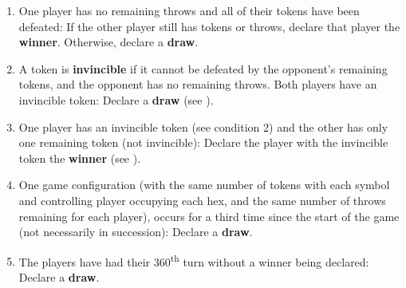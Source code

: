\documentclass[]{article}
\begin{document}
\begin{enumerate}
    \item
        One player has no remaining throws and all of their tokens have
        been defeated:
        If the other player still has tokens or throws, declare that player
        the \textbf{winner}.
        Otherwise, declare a \textbf{draw}.
    \item
        A token is \textbf{invincible} if it cannot be defeated by the
        opponent's remaining tokens, and the opponent has no remaining
        throws.
        Both players have an invincible token: Declare a \textbf{draw}
        (see ).
    \item
        One player has an invincible token (see condition 2) and the
        other has only one remaining token (not invincible):
        Declare the player with the invincible token the \textbf{winner}
        (see ).
    \item
        One game configuration (with the same number of tokens with each
        symbol and controlling player occupying each hex, and the same
        number of throws remaining for each player),
        occurs for a third time since the start of the game
        (not necessarily in succession):
        Declare a \textbf{draw}.
    \item
        The players have had their 360\textsuperscript{th} turn without a
        winner being declared:
        Declare a \textbf{draw}.
\end{enumerate}
\end{document}
